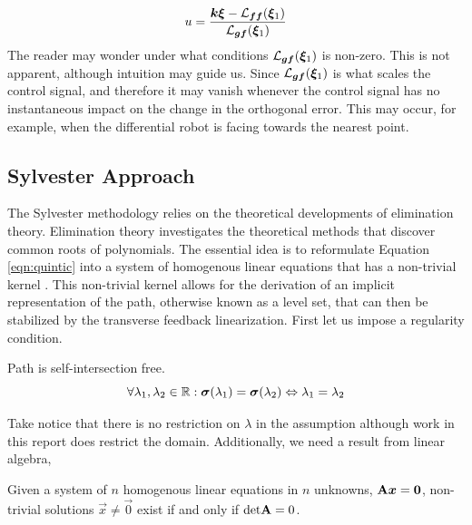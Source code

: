 \documentclass[oneside, 11pt]{book}
\begin{document}
\begin{equation}
    u = \frac{\bm{k}\bm{\xi} - \mathcal{L}_{\bm{f}\bm{f}}(\bm{\xi}_1)}{\mathcal{L}_{\bm{g}\bm{f}}(\bm{\xi}_1)}
\end{equation}
The reader may wonder under what conditions $\mathcal{L}_{\bm{g}\bm{f}}(\bm{\xi}_1)$ is non-zero. This is not apparent, although intuition may guide us. Since $\mathcal{L}_{\bm{g}\bm{f}}(\bm{\xi}_1)$ is what scales the control signal, and therefore it may vanish whenever the control signal has no instantaneous impact on the change in the orthogonal error. This may occur, for example, when the differential robot is facing towards the nearest point.

\subsection{Sylvester Approach}
The Sylvester methodology relies on the theoretical developments of elimination theory. Elimination theory investigates the theoretical methods that discover common roots of polynomials. The essential idea is to reformulate Equation \ref{eqn:quintic} into a system of homogenous linear equations that has a non-trivial kernel \cite{Sederberg84}. This non-trivial kernel allows for the derivation of an implicit representation of the path, otherwise known as a level set, that can then be stabilized by the transverse feedback linearization. First let us impose a regularity condition.

\begin{assumption}
    Path is self-intersection free.
    \begin{equation*}
        \forall \lambda_1, \lambda_2 \in\mathbb{R} : \bm{\sigma}(\lambda_1) = \bm{\sigma}(\lambda_2) \Leftrightarrow \lambda_1 = \lambda_2
    \end{equation*}
    \label{ass:self_intersect}
\end{assumption}

Take notice that there is no restriction on $\lambda$ in the assumption although work in this report does restrict the domain. Additionally, we need a result from linear algebra,

\begin{theorem}
    Given a system of $n$ homogenous linear equations in $n$ unknowns, $\mathbf{A}\bm{x}=\bm{0}$, non-trivial solutions $\vec{x}\neq\vec{0}$ exist if and only if $\text{det}\mathbf{A}=0$. \label{thm:kernel}
\end{theorem}
\end{document}
